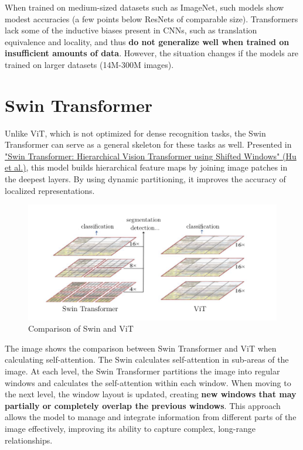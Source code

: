 When trained on medium-sized datasets such as ImageNet, such models show modest accuracies (a few points below ResNets of comparable size). Transformers lack some of the inductive biases present in CNNs, such as translation equivalence and locality, and thus \textbf{do not generalize well when trained on insufficient amounts of data}. However, the situation changes if the models are trained on larger datasets (14M-300M images).

\section{Swin Transformer}

Unlike ViT, which is not optimized for dense recognition tasks, the Swin Transformer can serve as a general skeleton for these tasks as well. Presented in \href{https://arxiv.org/pdf/2103.14030}{"Swin Transformer: Hierarchical Vision Transformer using Shifted Windows" (Hu et al.)}, this model builds hierarchical feature maps by joining image patches in the deepest layers. By using dynamic partitioning, it improves the accuracy of localized representations. 

\begin{figure}[!htbp]
    \centering
    \includegraphics[width=0.85\linewidth]{tikz/chapter8 - Swin Transformer.pdf}
    \caption{Comparison of Swin and ViT}
\end{figure}

The image shows the comparison between Swin Transformer and ViT when calculating self-attention. The Swin calculates self-attention in sub-areas of the image. At each level, the Swin Transformer partitions the image into regular windows and calculates the self-attention within each window. When moving to the next level, the window layout is updated, creating \textbf{new windows that may partially or completely overlap the previous windows}. This approach allows the model to manage and integrate information from different parts of the image effectively, improving its ability to capture complex, long-range relationships.